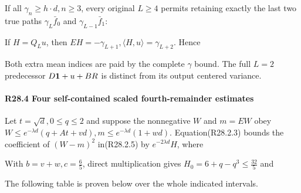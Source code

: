 If all \(\gamma_n\ge h\cdot d,\allowbreak \allowbreak n\ge 3\), every original \(L\ge 4\) permits retaining exactly the last two true paths \(\gamma_L \bar f_{0}\) and \(\gamma_{L-1}\bar f_1\):


If \(H=Q_Lu\), then \(EH=-\gamma_{L+1},\allowbreak \allowbreak \langle H,\allowbreak \allowbreak u\rangle =\gamma_{L+2}\). Hence


Both extra mean indices are paid by the complete \(\gamma\) bound. The full \(L=2\) predecessor \(D\mathbf1+u+BR\) is distinct from its output centered variance.

\paragraph{R28.4 Four self-contained scaled fourth-remainder estimates}

Let \(t=\sqrt{d},\allowbreak \allowbreak 0\le q\le 2\) and suppose the nonnegative \(W\) and \(m=EW\) obey \(W\le e^{-\lambda d}(q+A t+v d),\allowbreak \allowbreak m\le e^{-\lambda d}(1+w d)\). Equation(R28.2.3) bounds the coefficient of \((W-m)^2\) in(R28.2.5) by \(e^{-2\lambda d} H\), where


With \(b=v+w,\allowbreak \allowbreak c=\frac{6}{5}\), direct multiplication gives \(H_{0}=6+q-q^3\le \frac{32}{5}\) and


The following table is proven below over the whole indicated intervals.


